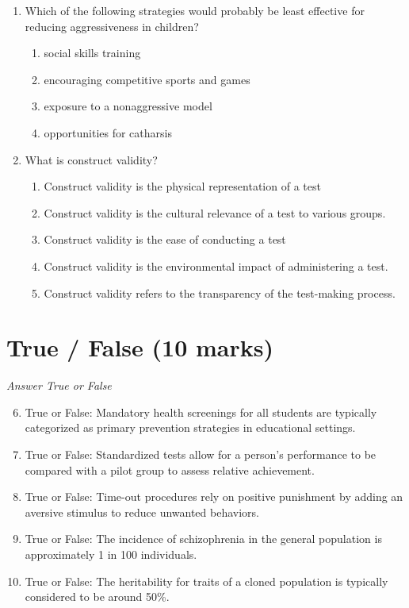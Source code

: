 \documentclass[12pt]{article}
\begin{document}
\begin{enumerate}[label=\arabic*.]
\begin{enumerate}[label=(\alph*)]
\end{enumerate}
\item Which of the following strategies would probably be least effective for reducing aggressiveness in children?
\begin{enumerate}[label=(\alph*)]
    \item social skills training
    \item encouraging competitive sports and games
    \item exposure to a nonaggressive model
    \item opportunities for catharsis
\end{enumerate}
\item What is construct validity?
\begin{enumerate}[label=(\alph*)]
    \item Construct validity is the physical representation of a test
    \item Construct validity is the cultural relevance of a test to various groups.
    \item Construct validity is the ease of conducting a test
    \item Construct validity is the environmental impact of administering a test.
    \item Construct validity refers to the transparency of the test-making process.
\end{enumerate}
\end{enumerate}

\section*{True / False (10 marks)}
\textit{Answer True or False}
\begin{enumerate}[label=\arabic*.]
\setcounter{enumi}{5}
\item True or False: Mandatory health screenings for all students are typically categorized as primary prevention strategies in educational settings.
\item True or False: Standardized tests allow for a person's performance to be compared with a pilot group to assess relative achievement.
\item True or False: Time-out procedures rely on positive punishment by adding an aversive stimulus to reduce unwanted behaviors.
\item True or False: The incidence of schizophrenia in the general population is approximately 1 in 100 individuals.
\item True or False: The heritability for traits of a cloned population is typically considered to be around 50\%.
\end{enumerate}
\end{document}
